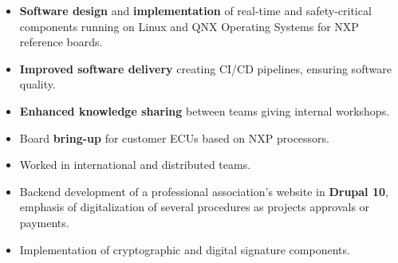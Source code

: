 \documentclass[10pt,a4paper,ragged2e,withhyper]{altacv}
\begin{document}
    \begin{paracol}{2}
    

     
                \begin{itemize}
                    \item \textbf{Software design} and \textbf{implementation} of real-time and safety-critical components running on Linux and QNX Operating Systems for NXP reference boards.
                    \item \textbf{Improved software delivery} creating CI/CD pipelines, ensuring software quality. 
                    \item \textbf{Enhanced knowledge sharing} between teams giving internal workshops.                    
                    \item Board \textbf{bring-up} for customer ECUs based on NXP processors.
                    \item Worked in international and distributed teams.
                \end{itemize}

                \divider\newline
        
            
                \begin{itemize}
                    \item Backend development of a professional association's website in \textbf{Drupal 10}, emphasis of digitalization of several procedures as projects approvals or payments.
                    \item Implementation of cryptographic and digital signature components.
                \end{itemize}
                
            
                

\end{paracol}
\end{document}
